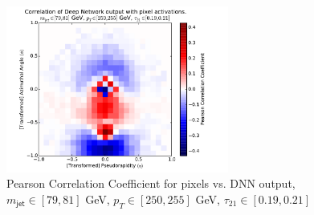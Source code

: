 \begin{figure}[htbp]
  \centering
  \includegraphics[width=0.65\textwidth]{figures/pixel-activations-corr-benwindow.pdf}
  \caption{Pearson Correlation Coefficient for pixels vs. DNN output, $m_{\mathsf{jet}}\in [79, 81]$ GeV, $p_{T}\in [250, 255]$ GeV, $\tau_{21}\in[0.19, 0.21]$}
  \label{fig:corrWindow}
\end{figure}

%




